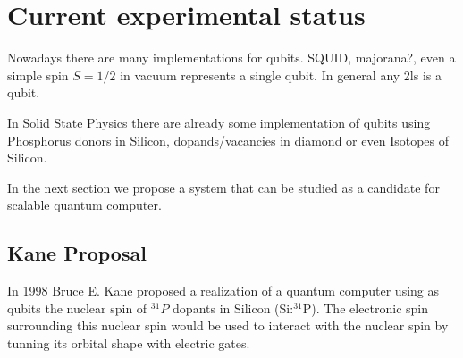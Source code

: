 \chapter{Current experimental status}

Nowadays there are many implementations for qubits. SQUID, majorana?, even a simple spin $S=1/2$ in vacuum represents a single qubit. In general any \ac{2ls} is a qubit.

In Solid State Physics there are already some implementation of qubits using Phosphorus donors in Silicon, dopands/vacancies in diamond or even Isotopes of Silicon.

In the next section we propose a system that can be studied as a candidate for scalable quantum computer.

\section{Kane Proposal}
In 1998 Bruce E. Kane proposed a realization of a quantum computer using as qubits the nuclear spin of $^{31}P$ dopants in Silicon (Si:$^{31}$P).
The electronic spin surrounding this nuclear spin would be used to interact with the nuclear spin by tunning its orbital shape with electric gates.

